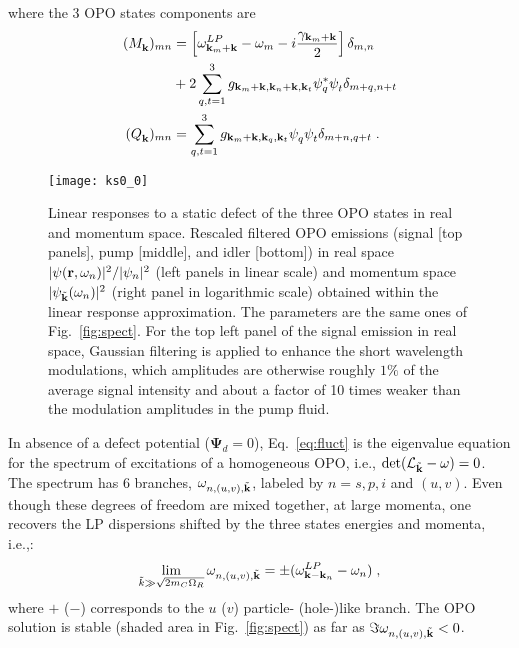 %
where the 3 OPO states components are
%
\begin{align}
  (M_{\vt{k}}^{})_{mn} &= \left[\omega^{LP}_{\vt{k}_m + \vt{k}}
    - \omega_m - i\frac{\gamma_{\vt{k}_m + \vt{k}}}{2}\right]
  \delta_{m,n} \\
%
  \nonumber & + 2\sum_{q,t=1}^3
  g_{\vt{k}_m+\vt{k},\vt{k}_n+\vt{k},\vt{k}_t} \psi_q^*
  \psi_t^{} \delta_{m+q,n+t}\\
%
  (Q_{\vt{k}}^{})_{mn} &= \sum_{q,t=1}^3
  g_{\vt{k}_m+\vt{k},\vt{k}_q,\vt{k}_t} \psi_q^{} \psi_t^{}
  \delta_{m+n,q+t}\; .
\end{align}
%


%
\begin{figure}[tb]
\centering
\texttt{[image: ks0\_0]}
\caption{Linear responses to a static defect of the three OPO states
  in real and momentum space. Rescaled filtered OPO emissions (signal
  [top panels], pump [middle], and idler [bottom]) in real space
  $|\psi (\mathbf{r},\omega_n)|^2/|\psi_n|^2$ (left panels in linear
  scale) and momentum space $|\psi_{\tilde{\mathbf{k}}} (\omega_n)|^2$
  (right panel in logarithmic scale) obtained within the linear
  response approximation. The parameters are the same ones of
  Fig.~\ref{fig:spect}. For the top left panel of the signal emission
  in real space, Gaussian filtering is applied to enhance the short
  wavelength modulations, which amplitudes are otherwise roughly $1\%$
  of the average signal intensity and about a factor of 10 times
  weaker than the modulation amplitudes in the pump fluid.}
\label{fig:ereal}
\end{figure}
%
In absence of a defect potential ($\bm{\Psi}_d =0$),
Eq.~\eqref{eq:fluct} is the eigenvalue equation for the spectrum of
excitations of a homogeneous OPO, i.e.,
$\det(\mathcal{L}_{\tilde{\mathbf{k}}} - \omega)=0$. The spectrum has 6
branches, $\omega_{n,(u,v),\tilde{\mathbf{k}}}$, labeled by $n=s,p,i$
and $(u,v)$. Even though these degrees of freedom are mixed together,
at large momenta, one recovers the LP dispersions shifted by the three
states energies and momenta, i.e.,:
%
\begin{equation}
  \lim_{\tilde{k} \gg \sqrt{2m_C \Omega_R}} \omega_{n,(u,v),\tilde{\mathbf{k}}} = \pm
  (\omega^{LP}_{\mathbf{k} - \mathbf{k}_n} - \omega_n)\; ,
\label{eq:large}
\end{equation}
%
where $+$ ($-$) corresponds to the $u$ ($v$) particle- (hole-)like
branch.
%
The OPO solution is stable (shaded area in Fig.~\ref{fig:spect}) as
far as $\Im \omega_{n,(u,v),\tilde{\mathbf{k}}} < 0$.

